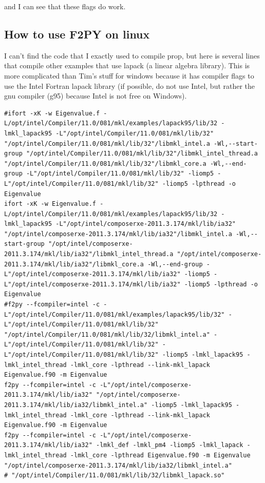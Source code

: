 and I can see that these flags do work.
\subsection{How to use F2PY on linux}
I can't find the code that I exactly used to compile prop,
but here is several lines that compile other examples that use lapack (a linear algebra library).
This is more complicated than Tim's stuff for windows because it has compiler flags to use the Intel Fortran lapack library (if possible, do not use Intel, but rather the gnu compiler (g95) because Intel is not free on Windows).

\begin{verbatim}
#ifort -xK -w Eigenvalue.f -L/opt/intel/Compiler/11.0/081/mkl/examples/lapack95/lib/32 -lmkl_lapack95 -L"/opt/intel/Compiler/11.0/081/mkl/lib/32" "/opt/intel/Compiler/11.0/081/mkl/lib/32"/libmkl_intel.a -Wl,--start-group "/opt/intel/Compiler/11.0/081/mkl/lib/32"/libmkl_intel_thread.a "/opt/intel/Compiler/11.0/081/mkl/lib/32"/libmkl_core.a -Wl,--end-group -L"/opt/intel/Compiler/11.0/081/mkl/lib/32" -liomp5 -L"/opt/intel/Compiler/11.0/081/mkl/lib/32" -liomp5 -lpthread -o Eigenvalue
ifort -xK -w Eigenvalue.f -L/opt/intel/Compiler/11.0/081/mkl/examples/lapack95/lib/32 -lmkl_lapack95 -L"/opt/intel/composerxe-2011.3.174/mkl/lib/ia32" "/opt/intel/composerxe-2011.3.174/mkl/lib/ia32"/libmkl_intel.a -Wl,--start-group "/opt/intel/composerxe-2011.3.174/mkl/lib/ia32"/libmkl_intel_thread.a "/opt/intel/composerxe-2011.3.174/mkl/lib/ia32"/libmkl_core.a -Wl,--end-group -L"/opt/intel/composerxe-2011.3.174/mkl/lib/ia32" -liomp5 -L"/opt/intel/composerxe-2011.3.174/mkl/lib/ia32" -liomp5 -lpthread -o Eigenvalue
#f2py --fcompiler=intel -c -L"/opt/intel/Compiler/11.0/081/mkl/examples/lapack95/lib/32" -L"/opt/intel/Compiler/11.0/081/mkl/lib/32" "/opt/intel/Compiler/11.0/081/mkl/lib/32/libmkl_intel.a" -L"/opt/intel/Compiler/11.0/081/mkl/lib/32" -L"/opt/intel/Compiler/11.0/081/mkl/lib/32" -liomp5 -lmkl_lapack95 -lmkl_intel_thread -lmkl_core -lpthread --link-mkl_lapack Eigenvalue.f90 -m Eigenvalue
f2py --fcompiler=intel -c -L"/opt/intel/composerxe-2011.3.174/mkl/lib/ia32" "/opt/intel/composerxe-2011.3.174/mkl/lib/ia32/libmkl_intel.a" -liomp5 -lmkl_lapack95 -lmkl_intel_thread -lmkl_core -lpthread --link-mkl_lapack Eigenvalue.f90 -m Eigenvalue
f2py --fcompiler=intel -c -L"/opt/intel/composerxe-2011.3.174/mkl/lib/ia32" -lmkl_def -lmkl_pm4 -liomp5 -lmkl_lapack -lmkl_intel_thread -lmkl_core -lpthread Eigenvalue.f90 -m Eigenvalue "/opt/intel/composerxe-2011.3.174/mkl/lib/ia32/libmkl_intel.a"
# "/opt/intel/Compiler/11.0/081/mkl/lib/32/libmkl_lapack.so"
\end{verbatim}
